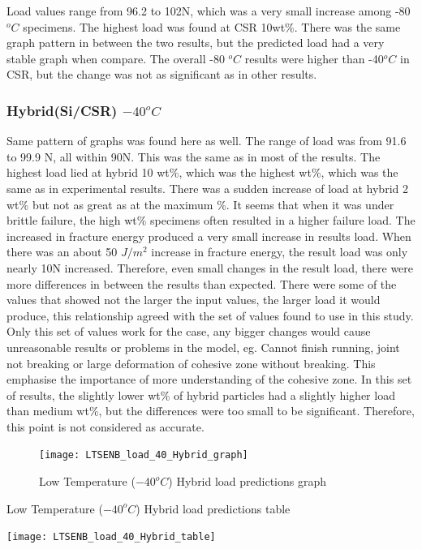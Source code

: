 \documentclass[numbers=noendperiod,chapterprefix=on]{icldt} %
\begin{document}
{Load values range from 96.2 to 102N, which was a very small increase among -80 $ ^{o}C $ specimens. The highest load was found at CSR 10wt\%. There was the same graph pattern in between the two results, but the predicted load had a very stable graph when compare. The overall -80 $ ^{o}C $ results were higher than -40$ ^{o}C $ in CSR, but the change was not as significant as in other results.

\subsubsection{Hybrid(Si/CSR) $ -40 ^{o}C$}

Same pattern of graphs was found here as well. The range of load was from 91.6 to 99.9 N, all within 90N. This was the same as in most of the results. The highest load lied at hybrid 10 wt\%, which was the highest wt\%, which was the same as in experimental results. There was a sudden increase of load at hybrid 2 wt\% but not as great as at the maximum \%.  It seems that when it was under brittle failure, the high wt\% specimens often resulted in a higher failure load.
The increased in fracture energy produced a very small increase in results load. When there was an about 50 $ J/m^{2} $ increase in fracture energy, the result load was only nearly 10N increased. Therefore, even small changes in the result load, there were more differences in between the results than expected. 
There were some of the values that showed not the larger the input values, the larger load it would produce, this relationship agreed with the set of values found to use in this study. Only this set of values work for the case, any bigger changes would cause unreasonable results or problems in the model, eg. Cannot finish running, joint not breaking or large deformation of cohesive zone without breaking. This emphasise the importance of more understanding of the cohesive zone.
In this set of results, the slightly lower wt\% of hybrid particles had a slightly higher load than medium wt\%, but the differences were too small to be significant. Therefore, this point is not considered as accurate.

\begin{figure}[!hp]
  \centering
  \texttt{[image: LTSENB\_load\_40\_Hybrid\_graph]}\label{LTSENB_load_40_Hybrid_graph}
  \caption{Low Temperature ($ -40 ^{o}C$) Hybrid load predictions graph}
  \end{figure}
 \FloatBarrier
 
 \begin{table}
    \centering
    \caption{Low Temperature ($ -40 ^{o}C$) Hybrid load predictions table}\label{LTSENB_load_40_Hybrid_table}
    \texttt{[image: LTSENB\_load\_40\_Hybrid\_table]}
    \end{table}
    \FloatBarrier

}
\end{document}
